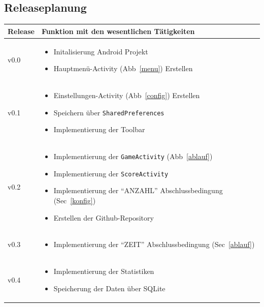 
\subsection{Releaseplanung}
\begin{table}[H]
\centering
\begin{tabular}{>{\centering\arraybackslash}m{} | m{} }
  \textbf{Release} & \textbf{Funktion mit den wesentlichen Tätigkeiten} \\
  \hline
  v0.0 & \begin{itemize}[leftmargin=*,itemsep=0pt]
    \item Initalisierung Android Projekt
    \item Hauptmenü-Activity (Abb~\ref{menu}) Erstellen
  \end{itemize} \\
  \hline
  v0.1 & \begin{itemize}[leftmargin=*,itemsep=0pt]
    \item Einstellungen-Activity (Abb~\ref{config}) Erstellen
    \item Speichern über \texttt{SharedPreferences}
    \item Implementierung der Toolbar
  \end{itemize} \\
  \hline
  v0.2 & \begin{itemize}[leftmargin=*,itemsep=0pt]
    \item Implementierung der \texttt{GameActivity} (Abb~\ref{ablauf})
    \item Implementierung der \texttt{ScoreActivity}
    \item Implementierung der \enquote{ANZAHL} Abschlussbedingung
      (Sec~\ref{konfig})
    \item Erstellen der Github-Repository
  \end{itemize} \\
  \hline
  v0.3 & \begin{itemize}[leftmargin=*,itemsep=0pt]
    \item Implementierung der \enquote{ZEIT} Abschlussbedingung
      (Sec~\ref{ablauf})
  \end{itemize} \\
  \hline
  v0.4 & \begin{itemize}[leftmargin=*,itemsep=0pt]
    \item Implementierung der Statistiken
    \item Speicherung der Daten über SQLite

\end{itemize}
\end{tabular}
\end{table}
